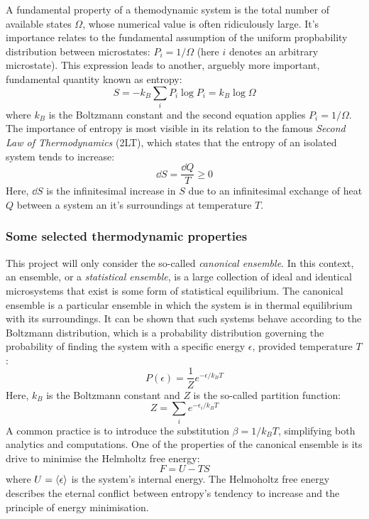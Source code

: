 \documentclass[nofootinbib,reprint,english]{revtex4-1}
\begin{document}
A fundamental property of a themodynamic system is the total number of available states \(\Omega\), whose numerical value is often ridiculously large.  It's importance relates to the fundamental assumption of the uniform propbability distribution between microstates: \(P_i=1/\Omega\) (here \(i\) denotes an arbitrary microstate). This expression leads to another, arguebly more important, fundamental quantity known as entropy:
\begin{equation}\label{eq:Entropy}
S=-k_B\sum_iP_i\log P_i=k_B\log\Omega
\end{equation}
where \(k_B\) is the Boltzmann constant and the second equation applies \(P_i=1/\Omega\). The importance of entropy is most visible in its relation to the famous \emph{Second Law of Thermodynamics} (2LT), which states that the entropy of an isolated system tends to increase:
\begin{equation}\label{eq:Second_Law_of_Thermodynamics}
\dd{S}=\frac{\dd{Q}}{T}\geq0
\end{equation}
Here, \(\dd{S}\) is the infinitesimal increase in \(S\) due to an infinitesimal exchange of heat \(Q\) between a system an it's surroundings at temperature \(T\).
\subsubsection{Some selected thermodynamic properties}\label{sec:selected_thermodynamic_properties}
This project will only consider the so-called \emph{canonical ensemble}. In this context, an ensemble, or a \emph{statistical ensemble}, is a large collection of ideal and identical microsystems that exist is some form of statistical equilibrium. The canonical ensemble is a particular ensemble in which the system is in thermal equilibrium with its surroundings. It can be shown that such systems behave according to the Boltzmann distribution, which is a probability distribution governing the probability of finding the system with a specific energy \(\epsilon\), provided temperature \(T\):
\begin{equation}\label{eq:Boltzmann_Distribution}
P(\epsilon)=\frac{1}{Z}e^{-\epsilon/k_BT}
\end{equation}
Here, \(k_B\) is the Boltzmann constant and \(Z\) is the so-called partition function:
\begin{equation}\label{eq:Partition_Function}
Z=\sum_ie^{-\epsilon_i/k_BT}
\end{equation}
A common practice is to introduce the substitution \(\beta=1/k_BT\), simplifying both analytics and computations. One of the properties of the canonical ensemble is its drive to minimise the Helmholtz free energy:
\begin{equation}\label{eq:Helmholtz_Free_Energy}
F=U-TS
\end{equation}
where \(U=\expval{\epsilon}\) is the system's internal energy. The Helmoholtz free energy describes the eternal conflict between entropy's tendency to increase and the principle of energy minimisation.
\end{document}
